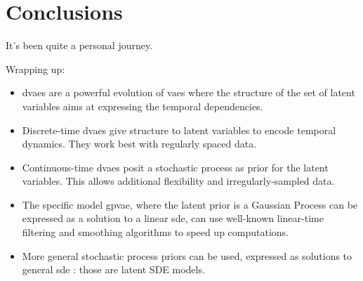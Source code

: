 \chapter{Conclusions}\label{sec:Conclusions}

It's been quite a personal journey.

Wrapping up:

\begin{itemize}
    \item \glspl{dvae} are a powerful evolution of \glspl{vae} where the structure of the set of latent variables 
    aims at expressing the temporal dependencies.
    \item Discrete-time \glspl{dvae} give structure to latent variables to encode temporal dynamics. They work best with regularly spaced data.
    \item Continuous-time \glspl{dvae} posit a stochastic process as prior for the latent variables. This allows 
    additional flexibility and irregularly-sampled data.
    \item The specific model \gls{gpvae}, where the latent prior is a Gaussian Process can be expressed as a 
    solution to a linear \gls{sde}, can use well-known linear-time filtering and smoothing algorithms to speed up 
    computations.
    \item More general stochastic process priors can be used, expressed as solutions to general \gls{sde} :
    those are latent SDE models.
\end{itemize}